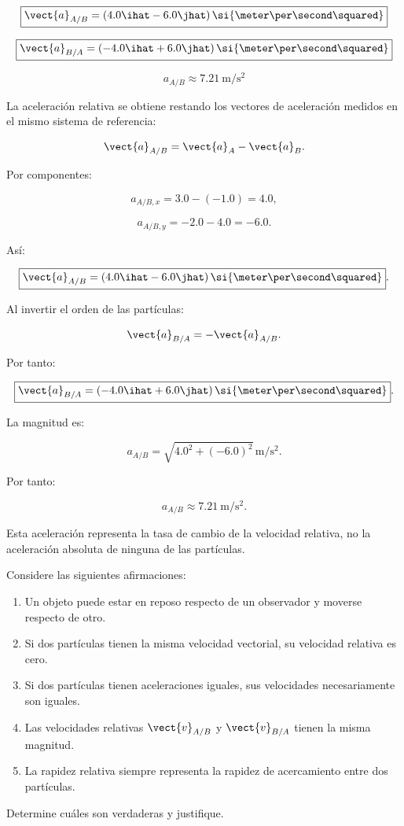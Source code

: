 \begin{respuesta}
\[
\boxed{
\vect{a}_{A/B}
=
(4.0\ihat-6.0\jhat)\,
\si{\meter\per\second\squared}
}
\]

\[
\boxed{
\vect{a}_{B/A}
=
(-4.0\ihat+6.0\jhat)\,
\si{\meter\per\second\squared}
}
\]

\[
\boxed{
a_{A/B}\approx
\SI{7.21}{\meter\per\second\squared}
}
\]
\end{respuesta}

\begin{explicacion}
La aceleración relativa se obtiene restando
los vectores de aceleración medidos en el mismo
sistema de referencia:

\[
\vect{a}_{A/B}
=
\vect{a}_A-\vect{a}_B.
\]

Por componentes:

\[
a_{A/B,x}=3.0-(-1.0)=4.0,
\]

\[
a_{A/B,y}=-2.0-4.0=-6.0.
\]

Así:

\[
\boxed{
\vect{a}_{A/B}
=
(4.0\ihat-6.0\jhat)\,
\si{\meter\per\second\squared}
}.
\]

Al invertir el orden de las partículas:

\[
\vect{a}_{B/A}
=
-\vect{a}_{A/B}.
\]

Por tanto:

\[
\boxed{
\vect{a}_{B/A}
=
(-4.0\ihat+6.0\jhat)\,
\si{\meter\per\second\squared}
}.
\]

La magnitud es:

\[
a_{A/B}
=
\sqrt{4.0^2+(-6.0)^2}\,
\si{\meter\per\second\squared}.
\]

Por tanto:

\[
\boxed{
a_{A/B}\approx
\SI{7.21}{\meter\per\second\squared}
}.
\]

Esta aceleración representa la tasa de cambio
de la velocidad relativa, no la aceleración
absoluta de ninguna de las partículas.
\end{explicacion}


\begin{ejercicio}
Considere las siguientes afirmaciones:

\begin{enumerate}[label=\alph*)]
    \item Un objeto puede estar en reposo respecto
    de un observador y moverse respecto de otro.
    \item Si dos partículas tienen la misma velocidad
    vectorial, su velocidad relativa es cero.
    \item Si dos partículas tienen aceleraciones iguales,
    sus velocidades necesariamente son iguales.
    \item Las velocidades relativas
    \(\vect{v}_{A/B}\) y \(\vect{v}_{B/A}\)
    tienen la misma magnitud.
    \item La rapidez relativa siempre representa
    la rapidez de acercamiento entre dos partículas.
\end{enumerate}

Determine cuáles son verdaderas y justifique.
\end{ejercicio}

